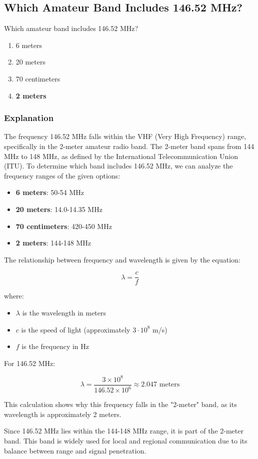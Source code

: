 \subsection{Which Amateur Band Includes 146.52 MHz?}
\label{T1B04}

\begin{tcolorbox}[colback=gray!10!white,colframe=black!75!black,title=T1B04]
Which amateur band includes 146.52 MHz?  
\begin{enumerate}[label=\Alph*)]
    \item 6 meters
    \item 20 meters
    \item 70 centimeters
    \item \textbf{2 meters}
\end{enumerate}
\end{tcolorbox}

\subsubsection{Explanation}
The frequency 146.52 MHz falls within the VHF (Very High Frequency) range, specifically in the 2-meter amateur radio band. The 2-meter band spans from 144 MHz to 148 MHz, as defined by the International Telecommunication Union (ITU). To determine which band includes 146.52 MHz, we can analyze the frequency ranges of the given options:

\begin{itemize}
    \item \textbf{6 meters}: 50-54 MHz
    \item \textbf{20 meters}: 14.0-14.35 MHz
    \item \textbf{70 centimeters}: 420-450 MHz
    \item \textbf{2 meters}: 144-148 MHz
\end{itemize}

The relationship between frequency and wavelength is given by the equation:

\[ \lambda = \frac{c}{f} \]

where:
\begin{itemize}
    \item \(\lambda\) is the wavelength in meters
    \item \(c\) is the speed of light (approximately $3 \cdot 10^8$ m/s)
    \item \(f\) is the frequency in Hz
\end{itemize}

For 146.52 MHz:

\[ \lambda = \frac{3 \times 10^8}{146.52 \times 10^6} \approx 2.047 \text{ meters} \]

This calculation shows why this frequency falls in the "2-meter" band, as its wavelength is approximately 2 meters.

Since 146.52 MHz lies within the 144-148 MHz range, it is part of the 2-meter band. This band is widely used for local and regional communication due to its balance between range and signal penetration.

